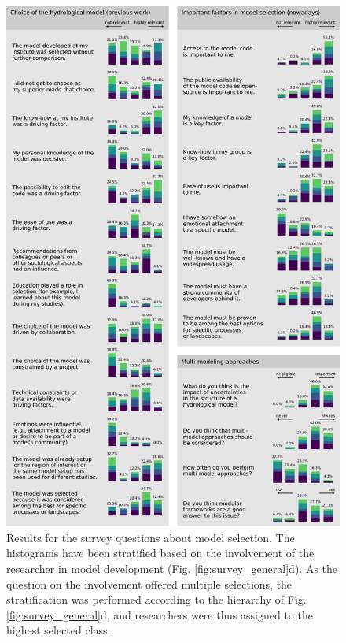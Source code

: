 \documentclass[10pt,a4paper]{article}
\begin{document}
\begin{figure}[htbp]
	\begin{center}
		\includegraphics[width=0.95\columnwidth]{figures/survey_histograms.pdf}
		\caption{{Results for the survey questions about model selection. The histograms have been stratified based on the involvement of the researcher in model development (Fig. \ref{fig:survey_general}d). As the question on the involvement offered multiple selections, the stratification was performed according to the hierarchy of Fig. \ref{fig:survey_general}d, and researchers were thus assigned to the highest selected class. 
		{\label{fig:survey_histograms}}
		}}
	\end{center}
\end{figure}
\end{document}
